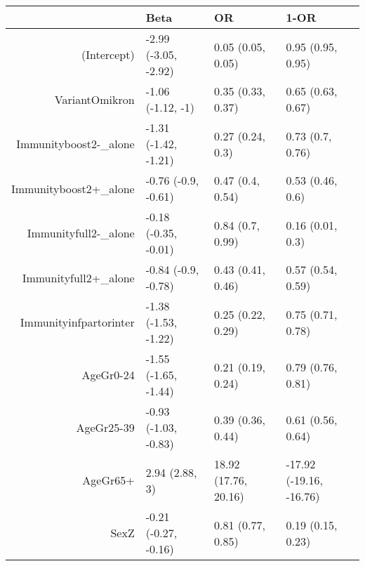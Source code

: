 \begin{table}[ht]
\centering
\begin{tabular}{rlll}
  \hline
 & Beta & OR & 1-OR \\ 
  \hline
(Intercept) & -2.99 (-3.05, -2.92) & 0.05 (0.05, 0.05) & 0.95 (0.95, 0.95) \\ 
  VariantOmikron & -1.06 (-1.12, -1) & 0.35 (0.33, 0.37) & 0.65 (0.63, 0.67) \\ 
  Immunityboost2-\_alone & -1.31 (-1.42, -1.21) & 0.27 (0.24, 0.3) & 0.73 (0.7, 0.76) \\ 
  Immunityboost2+\_alone & -0.76 (-0.9, -0.61) & 0.47 (0.4, 0.54) & 0.53 (0.46, 0.6) \\ 
  Immunityfull2-\_alone & -0.18 (-0.35, -0.01) & 0.84 (0.7, 0.99) & 0.16 (0.01, 0.3) \\ 
  Immunityfull2+\_alone & -0.84 (-0.9, -0.78) & 0.43 (0.41, 0.46) & 0.57 (0.54, 0.59) \\ 
  Immunityinfpartorinter & -1.38 (-1.53, -1.22) & 0.25 (0.22, 0.29) & 0.75 (0.71, 0.78) \\ 
  AgeGr0-24 & -1.55 (-1.65, -1.44) & 0.21 (0.19, 0.24) & 0.79 (0.76, 0.81) \\ 
  AgeGr25-39 & -0.93 (-1.03, -0.83) & 0.39 (0.36, 0.44) & 0.61 (0.56, 0.64) \\ 
  AgeGr65+ & 2.94 (2.88, 3) & 18.92 (17.76, 20.16) & -17.92 (-19.16, -16.76) \\ 
  SexZ & -0.21 (-0.27, -0.16) & 0.81 (0.77, 0.85) & 0.19 (0.15, 0.23) \\ 
   \hline
\end{tabular}
\end{table}
